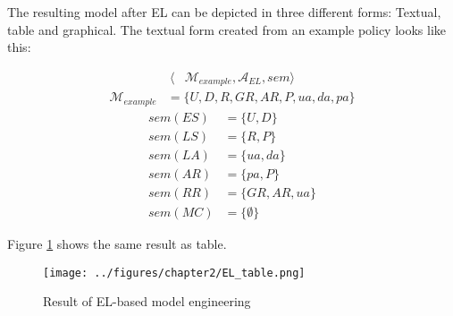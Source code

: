 \documentclass[twoside, openright, 12pt]{book}
\begin{document}
\begin{description}
\end{description}



\noindent
The resulting model after EL can be depicted in three different forms: Textual, table and graphical.
The textual form created from an example policy looks like this:

\begin{align*}
\langle &\mathcal{M}_{example}, \mathcal{A}_{EL}, sem \rangle
\end{align*}
\begin{align*}
\mathcal{M}_{example} &= \lbrace U, D, R, GR, AR, P, ua, da, pa \rbrace
\end{align*}
\begin{align*}
sem(ES) &= \lbrace U, D \rbrace\\
sem(LS) &= \lbrace R, P \rbrace\\
sem(LA) &= \lbrace ua, da \rbrace\\
sem(AR) &= \lbrace pa, P \rbrace\\
sem(RR) &= \lbrace GR, AR, ua \rbrace\\
sem(MC) &= \lbrace \emptyset \rbrace
\end{align*}

\noindent
Figure \ref{fig:EL_table} shows the same result as table.

\begin{figure}[htb]
	\centering
	\texttt{[image: ../figures/chapter2/EL\_table.png]}
	\caption{Result of EL-based model engineering \cite[p.77, table 4.1]{Amthor18}}
	\label{fig:EL_table}
\end{figure}
\end{document}
